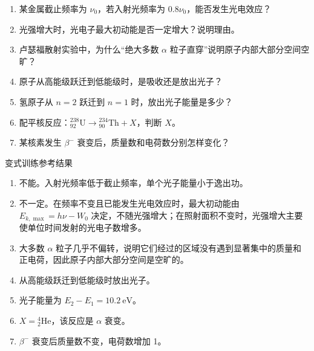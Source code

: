 \begin{enumerate}
  \item 某金属截止频率为 $\nu_0$，若入射光频率为 $0.8\nu_0$，能否发生光电效应？
  \item 光强增大时，光电子最大初动能是否一定增大？说明理由。
  \item 卢瑟福散射实验中，为什么“绝大多数 $\alpha$ 粒子直穿”说明原子内部大部分空间空旷？
  \item 原子从高能级跃迁到低能级时，是吸收还是放出光子？
  \item 氢原子从 $n=2$ 跃迁到 $n=1$ 时，放出光子能量是多少？
  \item 配平核反应：${}^{238}_{92}\mathrm{U}\rightarrow{}^{234}_{90}\mathrm{Th}+X$，判断 $X$。
  \item 某核素发生 $\beta^-$ 衰变后，质量数和电荷数分别怎样变化？
  \begin{center}
  
  \end{center}
\end{enumerate}

\begin{learningbox}{变式训练参考结果}
\begin{enumerate}[itemsep=0.45em,topsep=0.3em,parsep=0pt]
  \item 不能。入射光频率低于截止频率，单个光子能量小于逸出功。
  \item 不一定。在频率不变且已能发生光电效应时，最大初动能由
  $E_{k,\max}=h\nu-W_0$ 决定，不随光强增大；在照射面积不变时，光强增大主要使单位时间发射的光电子数增多。
  \item 大多数 $\alpha$ 粒子几乎不偏转，说明它们经过的区域没有遇到显著集中的质量和正电荷，因此原子内部大部分空间是空旷的。
  \item 从高能级跃迁到低能级时放出光子。
  \item 光子能量为 $E_2-E_1=10.2\ \mathrm{eV}$。
  \item $X={}^{4}_{2}\mathrm{He}$，该反应是 $\alpha$ 衰变。
  \item $\beta^-$ 衰变后质量数不变，电荷数增加 1。
\end{enumerate}
\end{learningbox}

